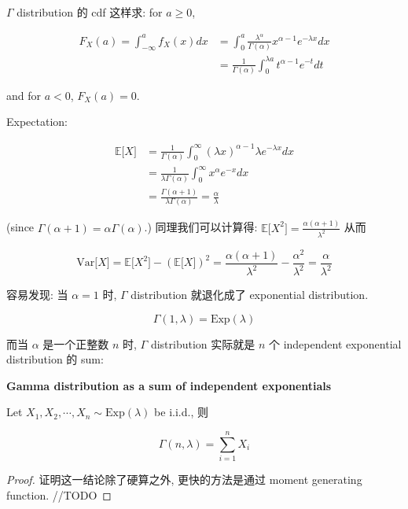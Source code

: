 \documentclass{qlnotes-export}
\begin{document}
\(\Gamma\) distribution 的 cdf 这样求: for \(a \geq 0\),

\[\begin{matrix}
{F_{X}(a) = \int_{- \infty}^{a}f_{X}(x) dx} & {= \int_{0}^{a}\frac{\lambda^{\alpha}}{\Gamma(\alpha)}x^{\alpha - 1}e^{- \lambda x} dx} \\
 & {= \frac{1}{\Gamma(\alpha)}\int_{0}^{\lambda a}t^{\alpha - 1}e^{- t} dt}
\end{matrix}\]

and for \(a < 0\), \(F_{X}(a) = 0\).

Expectation:

\[\begin{matrix}
{{\mathbb{E}}\lbrack X\rbrack} & {= \frac{1}{\Gamma(\alpha)}\int_{0}^{\infty}(\lambda x)^{\alpha - 1}\lambda e^{- \lambda x} dx} \\
 & {= \frac{1}{\lambda\Gamma(\alpha)}\int_{0}^{\infty}x^{\alpha}e^{- x} dx} \\
 & {= \frac{\Gamma(\alpha + 1)}{\lambda\Gamma(\alpha)} = \frac{\alpha}{\lambda}}
\end{matrix}\]

(since \(\Gamma(\alpha + 1) = \alpha\Gamma(\alpha)\).) 同理我们可以计算得: \({\mathbb{E}}\lbrack X^{2}\rbrack = \frac{\alpha(\alpha + 1)}{\lambda^{2}}\) 从而

\[\text{Var}\lbrack X\rbrack = {\mathbb{E}}\lbrack X^{2}\rbrack - ({\mathbb{E}}\lbrack X\rbrack)^{2} = \frac{\alpha(\alpha + 1)}{\lambda^{2}} - \frac{\alpha^{2}}{\lambda^{2}} = \frac{\alpha}{\lambda^{2}}\]

容易发现: 当 \(\alpha = 1\) 时, \(\Gamma\) distribution 就退化成了 exponential distribution.

\[\Gamma(1,\lambda) = \text{Exp}(\lambda)\]

而当 \(\alpha\) 是一个正整数 \(n\) 时, \(\Gamma\) distribution 实际就是 \(n\) 个 independent exponential distribution 的 sum:

\begin{proposition}{\protect{}\label{kn-gamma-as-sum-of-independent-exponentials}{\textbf{Gamma
distribution as a sum of independent exponentials}}}

Let \(X_{1},X_{2},\cdots,X_{n} \sim \text{Exp}(\lambda)\) be i.i.d., 则

\[\Gamma(n,\lambda) = \sum\limits_{i = 1}^{n}X_{i}\]

\end{proposition}

\begin{proof}

证明这一结论除了硬算之外, 更快的方法是通过 moment generating function. //TODO

\end{proof}
\end{document}
